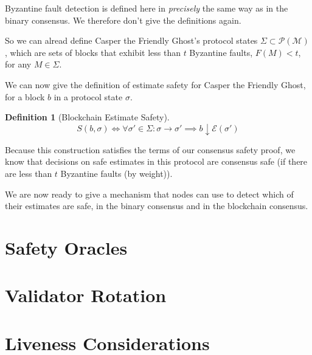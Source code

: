 \documentclass{article}
\theoremstyle{definition}
\newtheorem{defn}{Definition}[section]
\begin{document}
Byzantine fault detection is defined here in \emph{precisely} the same way as in the binary consensus. We therefore don't give the definitions again. 

So we can alread define Casper the Friendly Ghost's protocol states $\Sigma \subset \mathcal{P}(\mathcal{M})$, which are sets of blocks that exhibit less than $t$ Byzantine faults, $F(M) < t$, for any $M \in \Sigma$.

We can now give the definition of estimate safety for Casper the Friendly Ghost, for a block $b$ in a protocol state $\sigma$.

\begin{defn}[Blockchain Estimate Safety]
$$
S(b, \sigma) \iff \forall \sigma' \in \Sigma: \sigma \to \sigma' \implies b \downarrow \mathcal{E}(\sigma')
$$
\end{defn}

Because this construction satisfies the terms of our consensus safety proof, we know that decisions on safe estimates in this protocol are consensus safe (if there are less than $t$ Byzantine faults (by weight)). 

We are now ready to give a mechanism that nodes can use to detect which of their estimates are safe, in the binary consensus and in the blockchain consensus.
\section{Safety Oracles}

\section{Validator Rotation}

\section{Liveness Considerations}
\end{document}
